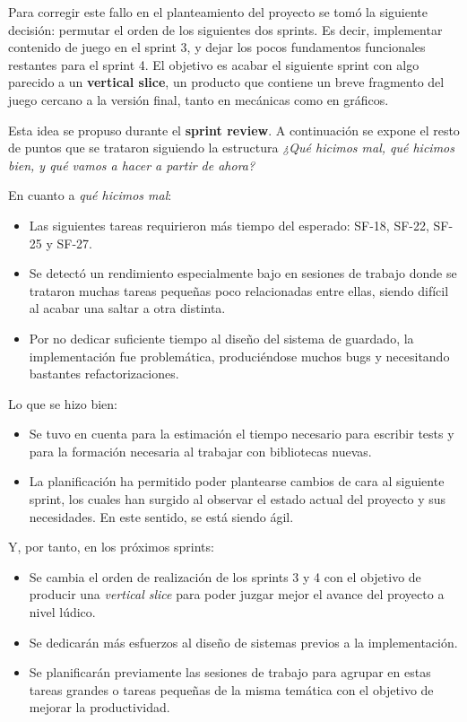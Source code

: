 Para corregir este fallo en el planteamiento del proyecto se tomó la siguiente decisión: permutar el orden de los siguientes dos sprints. Es decir, implementar contenido de juego en el sprint 3, y dejar los pocos fundamentos funcionales restantes para el sprint 4. El objetivo es acabar el siguiente sprint con algo parecido a un \textbf{vertical slice}, un producto que contiene un breve fragmento del juego cercano a la versión final, tanto en mecánicas como en gráficos.

Esta idea se propuso durante el \textbf{sprint review}. A continuación se expone el resto de puntos que se trataron siguiendo la estructura \textit{¿Qué hicimos mal, qué hicimos bien, y qué vamos a hacer a partir de ahora?}

En cuanto a \textit{qué hicimos mal}:
\begin{itemize}
    \item Las siguientes tareas requirieron más tiempo del esperado: SF-18, SF-22, SF-25 y SF-27.
    \item Se detectó un rendimiento especialmente bajo en sesiones de trabajo donde se trataron muchas tareas pequeñas poco relacionadas entre ellas, siendo difícil al acabar una saltar a otra distinta.
    \item Por no dedicar suficiente tiempo al diseño del sistema de guardado, la implementación fue problemática, produciéndose muchos bugs y necesitando bastantes refactorizaciones.
\end{itemize}

Lo que se hizo bien:
\begin{itemize}
    \item Se tuvo en cuenta para la estimación el tiempo necesario para escribir tests y para la formación necesaria al trabajar con bibliotecas nuevas. 
    \item La planificación ha permitido poder plantearse cambios de cara al siguiente sprint, los cuales han surgido al observar el estado actual del proyecto y sus necesidades. En este sentido, se está siendo ágil.
\end{itemize}

Y, por tanto, en los próximos sprints:
\begin{itemize}
    \item Se cambia el orden de realización de los sprints 3 y 4 con el objetivo de producir una \textit{vertical slice} para poder juzgar mejor el avance del proyecto a nivel lúdico.
    \item Se dedicarán más esfuerzos al diseño de sistemas previos a la implementación.
    \item Se planificarán previamente las sesiones de trabajo para agrupar en estas tareas grandes o tareas pequeñas de la misma temática con el objetivo de mejorar la productividad.
\end{itemize}

